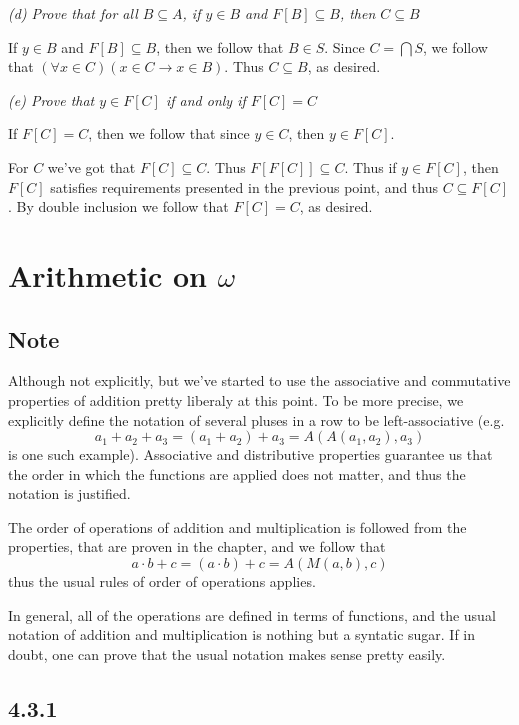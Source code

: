 \documentclass[11pt,oneside,titlepage]{book}
\begin{document}
\textit{(d) Prove that for all $B \subseteq A$, if $y \in B$ and $F[B] \subseteq B$, then
  $C \subseteq B$}

If $y \in B$ and $F[B] \subseteq B$, then we follow that $B \in S$. Since $C = \bigcap S$,
we follow that $(\forall x \in C) (x \in C \to x \in B)$. Thus $C \subseteq B$, as desired.

\textit{(e) Prove that $y \in F[C]$ if and only if $F[C] = C$}

If $F[C] = C$, then we follow that since $y \in C$, then $y \in F[C]$.

For $C$ we've got that $F[C] \subseteq C$. Thus $F[F[C]] \subseteq C$. Thus if $y \in F[C]$, then
$F[C]$ satisfies requirements presented in the previous point, and thus $C \subseteq F[C]$.
By double inclusion we follow that $F[C] = C$, as desired.

\section{Arithmetic on $\omega$}

\subsection*{Note}

Although not explicitly, but we've started to use the associative and commutative
properties of addition pretty liberaly at this point. To be more precise,
we explicitly define the notation of several pluses in a row to be left-associative (e.g.
$$a_1 + a_2 + a_3 = (a_1 + a_2) + a_3 = A(A(a_1, a_2), a_3) $$
is one such example). Associative and distributive properties guarantee us that the order in
which the functions are applied does not matter, and thus the notation is justified.

The order of operations of addition and multiplication is followed from the properties,
that are proven in the chapter, and we follow that
$$a \cdot b + c = (a \cdot b) + c = A(M(a, b), c)$$
thus the usual rules of order of operations applies.

In general, all of the operations are defined in terms of functions, and the usual notation
of addition and multiplication is nothing but a syntatic sugar. If in doubt, one can
prove that the usual notation makes sense pretty easily.

\subsection*{4.3.1}
\end{document}
